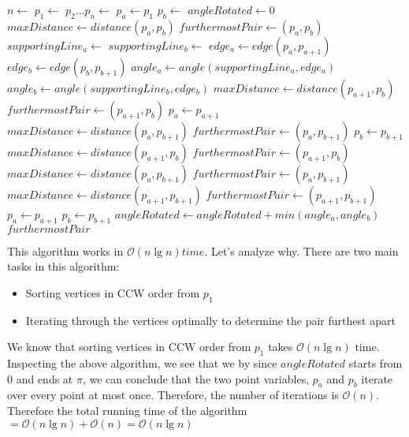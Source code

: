 \documentclass{article}
\begin{document}
\begin{algorithmic}
\State $n \gets $
\State $p_1 \gets $ 
\State $p_2 \dots p_n\gets $ 
\State $p_a \gets p_1 $
\State $p_b \gets $
\State $angleRotated \gets 0 $
\State $maxDistance \gets distance(p_a, p_b)$
\State $furthermostPair \gets (p_a, p_b) $
\State $supportingLine_a \gets $ 
\State $supportingLine_b \gets $ 
	\State $edge_a \gets edge(p_a, p_{a+1})$
	\State $edge_b \gets edge(p_b, p_{b+1})$
	\State $angle_a \gets angle(supportingLine_a, edge_a)$
	\State $angle_b \gets angle(supportingLine_b, edge_b)$
			\State $maxDistance \gets distance(p_{a+1}, p_b)$
			\State $furthermostPair \gets (p_{a+1}, p_b) $
		\EndIf
		\State $p_a \gets p_{a+1} $ 
			\State $maxDistance \gets distance(p_a, p_{b+1})$
			\State $furthermostPair \gets (p_a, p_{b+1}) $
		\EndIf
		\State $p_b \gets p_{b+1} $ 
	\Else {}
			\State $maxDistance \gets distance(p_{a+1}, p_b)$
			\State $furthermostPair \gets (p_{a+1}, p_b) $
			\State $maxDistance \gets distance(p_a, p_{b+1})$
			\State $furthermostPair \gets (p_a, p_{b+1}) $
			\State $maxDistance \gets distance(p_{a+1}, p_{b+1})$
			\State $furthermostPair \gets (p_{a+1}, p_{b+1}) $
		\EndIf
		\State $p_a \gets p_{a+1} $ 
		\State $p_b \gets p_{b+1} $ 	
	\EndIf
	\State $angleRotated \gets angleRotated + min(angle_a, angle_b)$
\EndWhile
\State \Return $furthermostPair$
\end{algorithmic}

This algorithm works in $\mathcal{O}(n \lg n) time$. Let's analyze why. There are two main tasks in this algorithm:
\begin{itemize}
  \item Sorting vertices in CCW order from $p_1$
  \item Iterating through the vertices optimally to determine the pair furthest apart
\end{itemize}
We know that sorting vertices in CCW order from $p_1$ takes $\mathcal{O}(n \lg n)$ time.
\newline 
Inspecting the above algorithm, we see that we by since $angleRotated$ starts from 0 and ends at $\pi$, we can conclude that the two point variables, $p_a$ and $p_b$ iterate over every point at most once. Therefore, the number of iterations is $\mathcal{O}(n)$.
\newline
Therefore the total running time of the algorithm $= \mathcal{O}(n \lg n) + \mathcal{O}(n) = \mathcal{O}(n \lg n)$
\end{document}
